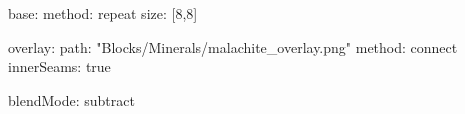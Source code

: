 base:
  method: repeat
  size: [8,8]

overlay:
  path: "Blocks/Minerals/malachite_overlay.png"
  method: connect
  innerSeams: true

blendMode: subtract